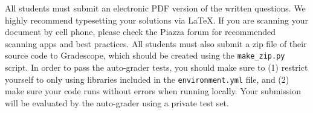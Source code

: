 All students must submit an electronic PDF version of the written questions. We
highly recommend typesetting your solutions via \LaTeX. If you are scanning
your document by cell phone, please check the Piazza forum for recommended
scanning apps and best practices. All students must also submit a zip file of
their source code to Gradescope, which should be created using the
\texttt{make\_zip.py} script. In order to pass the auto-grader tests, you
should make sure to (1) restrict yourself to only using libraries included in
the \texttt{environment.yml} file, and (2) make sure your code runs without
errors when running locally.  Your submission will be evaluated by the
auto-grader using a private test set.
